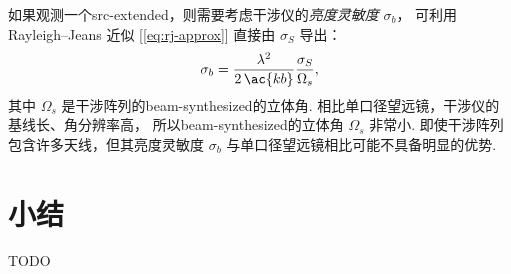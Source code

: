 如果观测一个\ac{src-extended}，则需要考虑干涉仪的\emph{亮度灵敏度} $\sigma_b$，
可利用 Rayleigh--Jeans 近似 [\autoref{eq:rj-approx}]
直接由 $\sigma_S$ 导出：
\begin{equation}
  \label{eq:sigma-tb}
  \sigma_b = \frac{\lambda^2}{2\,\ac{kb}} \frac{\sigma_S}{\Omega_s} ,
\end{equation}
其中 $\Omega_s$ 是干涉阵列的\ac{beam-synthesized}的立体角.
相比单口径望远镜，干涉仪的基线长、角分辨率高，
所以\ac{beam-synthesized}的立体角 $\Omega_s$ 非常小.
即使干涉阵列包含许多天线，但其亮度灵敏度 $\sigma_b$
与单口径望远镜相比可能不具备明显的优势.


\section{小结}

TODO


